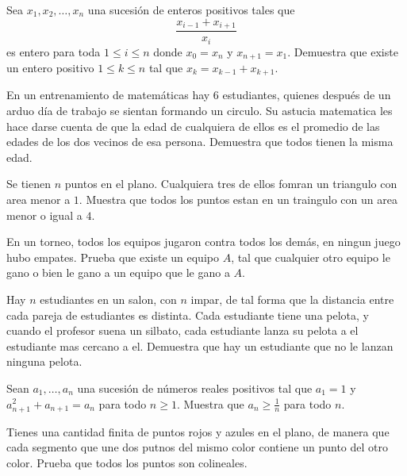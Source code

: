 \documentclass[11pt]{scrartcl}
\newcommand{\gad}{\textcolor{yellow}{$\bigstar$}}
\newcommand{\thmdifficulty}{0}
\newcommand{\problemdiff}[1]{\renewcommand{\thmdifficulty}{#1}}
\begin{document}
\problemdiff{2}
\begin{problema} 
    Sea $x_1,x_2,\ldots,x_n$ una sucesión de enteros positivos tales que 
    \[\frac{x_{i-1}+x_{i+1}}{x_i}\] es entero para toda $1 \leq i \leq n$ donde $x_0=x_n$ y $x_{n+1}=x_1$.  Demuestra que existe un entero positivo $1 \leq k \leq n$ tal que $x_k=x_{k-1}+x_{k+1}$. 
\end{problema}

\problemdiff{2}
\begin{problema}
    En un entrenamiento de matemáticas hay 6 estudiantes, quienes después de un arduo día de trabajo se sientan formando un circulo. Su astucia matematica les hace darse cuenta 
    de que la edad de cualquiera de ellos es el promedio de las edades de los dos vecinos de esa persona. Demuestra que todos tienen la misma edad.
\end{problema}



\problemdiff{3}
\begin{problema} [\gad]
    Se tienen $n$ puntos en el plano. Cualquiera tres de ellos fomran un triangulo con area menor a $1$. Muestra que todos los puntos estan en un traingulo con un area menor o igual a $4$.
\end{problema}

\problemdiff{3}
\begin{problema}
    En un torneo, todos los equipos jugaron contra todos los demás, en ningun juego hubo empates. Prueba que existe un equipo $A$, tal que cualquier otro equipo le gano o bien le gano a un equipo que le gano a $A$.
\end{problema}


\problemdiff{3}
\begin{problema}
    Hay $n$ estudiantes en un salon, con $n$ impar, de tal forma que la distancia entre cada pareja de estudiantes es distinta. Cada estudiante tiene una pelota, y cuando el profesor suena un silbato, cada estudiante lanza su pelota a el estudiante mas cercano a el. Demuestra que hay un estudiante que no le lanzan ninguna pelota.
\end{problema}

\problemdiff{3}
\begin{problema}
    Sean $a_1,\ldots, a_n$ una sucesión de números reales positivos tal que $a_1=1$ y $a_{n+1}^2+a_{n+1}=a_n$ para todo $n \geq 1$. Muestra que $a_n\geq \frac 1n$ para todo $n$.
\end{problema}

\problemdiff{4}
\begin{problema}
    Tienes una cantidad finita de puntos rojos y azules en el plano, de manera que cada segmento que une dos putnos del mismo color contiene un punto del otro color. Prueba que todos los puntos son colineales.
\end{problema}
\end{document}
